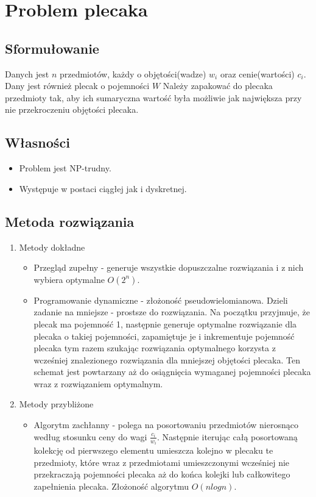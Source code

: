 \section{Problem plecaka}

	\subsection{Sformułowanie}
		Danych jest $n$ przedmiotów, każdy o objętości(wadze) $w_i$ oraz cenie(wartości) $c_i$.
		Dany jest również plecak o pojemności $W$
		Należy zapakować do plecaka przedmioty tak, aby ich sumaryczna wartość była możliwie jak największa przy
		nie przekroczeniu objętości plecaka.
		
	\subsection{Własności}
		\begin{itemize}
			\item Problem jest NP-trudny.
			\item Występuje w postaci ciągłej jak i dyskretnej.
		\end{itemize}
	\subsection{Metoda rozwiązania} \label{knapsack}
		\begin{enumerate}
			\item Metody dokładne
			\begin{itemize}
				\item Przegląd zupełny - generuje wszystkie dopuszczalne rozwiązania i z nich wybiera optymalne $O(2^n)$.
				\item Programowanie dynamiczne - złożoność pseudowielomianowa. Dzieli zadanie na mniejsze - prostsze do 
				rozwiązania. Na początku przyjmuje, że plecak ma pojemność 1, następnie generuje optymalne rozwiązanie
				dla plecaka o takiej pojemności, zapamiętuje je i inkrementuje pojemność plecaka tym razem szukając 
				rozwiązania optymalnego korzysta z wcześniej znalezionego rozwiązania dla mniejszej objętości plecaka.
				Ten schemat jest powtarzany aż do osiągnięcia wymaganej pojemności plecaka wraz z rozwiązaniem optymalnym.
			\end{itemize}
			\item Metody przybliżone
			\begin{itemize}
				\item Algorytm zachłanny - polega na posortowaniu przedmiotów nierosnąco według stosunku ceny do wagi 
				$\frac{c_i}{w_i}$. Następnie iterując całą posortowaną kolekcję od pierwszego elementu
				 umieszcza kolejno w plecaku te przedmioty, które wraz z przedmiotami umieszczonymi wcześniej nie 
				 przekraczają pojemności plecaka aż do końca kolejki lub całkowitego zapełnienia plecaka. 
				 Złożoność algorytmu $O(n logn)$.
			\end{itemize}
		\end{enumerate}
